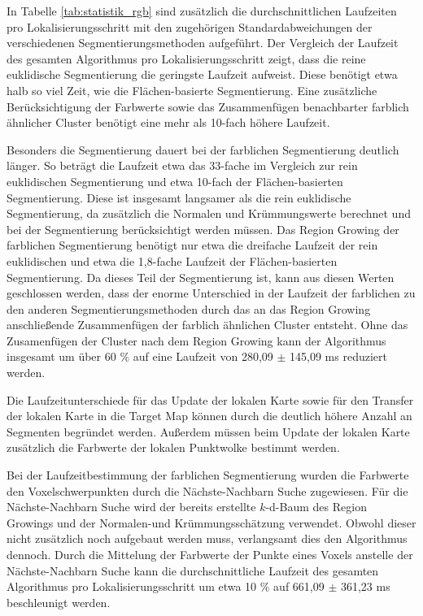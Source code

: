 In Tabelle \ref{tab:statistik_rgb} sind zusätzlich die durchschnittlichen Laufzeiten pro Lo\-ka\-li\-sie\-rungs\-schritt mit den zugehörigen Standardabweichungen der verschiedenen \linebreak Segmentierungsmethoden aufgeführt. Der Vergleich der Laufzeit des gesamten Algorithmus pro Lokalisierungsschritt zeigt, dass die reine euklidische Segmentierung die geringste Laufzeit aufweist. Diese benötigt etwa halb so viel Zeit, wie die Flächen-basierte Segmentierung. Eine zusätzliche Berücksichtigung der Farbwerte sowie das Zusammenfügen benachbarter farblich ähnlicher Cluster benötigt eine mehr als 10-fach höhere Laufzeit. 

Besonders die Segmentierung dauert bei der farblichen Segmentierung deutlich länger. So beträgt die Laufzeit etwa das 33-fache im Vergleich zur  rein euklidischen Segmentierung und etwa 10-fach der Flächen-basierten Segmentierung. Diese ist insgesamt langsamer als die rein euklidische Segmentierung, da zusätzlich die Normalen und Krümmungswerte berechnet und bei der Segmentierung berücksichtigt werden müssen. Das Region Growing der farblichen Segmentierung benötigt nur etwa die dreifache Laufzeit der rein euklidischen und etwa die 1,8-fache Laufzeit der Flächen-basierten Segmentierung. Da dieses Teil der Segmentierung ist, kann aus diesen Werten geschlossen werden, dass der enorme Unterschied in der Laufzeit der farblichen zu den anderen Segmentierungsmethoden durch das an das Region Growing anschließende Zusammenfügen der farblich ähnlichen Cluster entsteht. Ohne das Zusamenfügen der Cluster nach dem Region Growing kann der Algorithmus insgesamt um über 60 $\%$  auf eine Laufzeit von 280,09 $\pm$ 145,09 ms reduziert werden.

Die Laufzeitunterschiede für das Update der lokalen Karte sowie für den Transfer der lokalen Karte in die Target Map können durch die deutlich höhere Anzahl an Segmenten begründet werden. Außerdem müssen beim Update der lokalen Karte zusätzlich die Farbwerte der lokalen Punktwolke bestimmt werden. 

Bei der Laufzeitbestimmung der farblichen Segmentierung wurden die Farbwerte den Voxelschwerpunkten durch die Nächste-Nachbarn Suche zugewiesen. Für die Nächste-Nachbarn Suche wird der bereits erstellte $k$-d-Baum des Region Growings und der Normalen-und Krümmungsschätzung verwendet. Obwohl dieser nicht zusätzlich noch aufgebaut werden muss, verlangsamt dies den Algorithmus dennoch. Durch die Mittelung der Farbwerte der Punkte eines Voxels anstelle der Nächste-Nachbarn Suche kann die durchschnittliche Laufzeit des gesamten Algorithmus pro Lokalisierungsschritt um etwa 10 $\%$ auf 661,09 $\pm$ 361,23 ms beschleunigt werden. 

